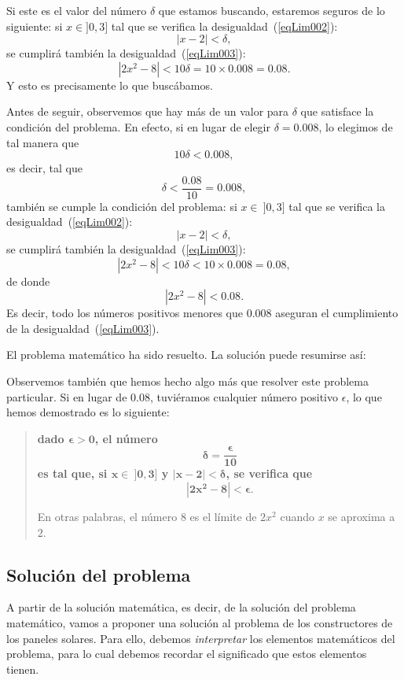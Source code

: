 Si este es el valor del número $\delta$ que estamos buscando, estaremos seguros de lo siguiente: si
$x\in ]0, 3]$ tal que se verifica la desigualdad~(\ref{eqLim002}):
\[
|x - 2| < \delta,
\]
se cumplirá también la desigualdad~(\ref{eqLim003}):
\[
|2x^2 - 8| < 10\delta = 10\times 0.008 = 0.08.
\]
Y esto es precisamente lo que buscábamos.

Antes de seguir, observemos que hay más de un valor para $\delta$ que satisface la condición del
problema. En efecto, si en lugar de elegir $\delta = 0.008$, lo elegimos de tal manera que
\[
10\delta < 0.008,
\]
es decir, tal que
\[
\delta < \frac{0.08}{10} = 0.008,
\]
también se cumple la condición del problema: si $x \in\ ]0, 3]$ tal que se verifica la
desigualdad~(\ref{eqLim002}):
\[
|x - 2| < \delta,
\]
se cumplirá también la desigualdad~(\ref{eqLim003}):
\[
|2x^2 - 8| < 10\delta < 10\times 0.008 = 0.08,
\]
de donde
\[
|2x^2 - 8| < 0.08.
\]
Es decir, todo los números positivos menores que $0.008$ aseguran el cumplimiento de la
desigualdad~(\ref{eqLim003}).

El problema matemático ha sido resuelto. La solución puede resumirse así:%
\marcojc{.9}{1.5}{black}{black}{white}{%
si se elige el número $\delta > 0$ tal que
\[
\delta \leq 0.008,
\]
entonces, si $x\in\ ]0,3]$ y $|x - 2| < \delta$, necesariamente se cumplirá la siguiente
desigualdad:
\[
|2x^2 - 8| < 0.08.
\]
\eijc{-1.5} }

Observemos también que hemos hecho algo más que resolver este problema particular. Si en lugar de
$0.08$, tuviéramos cualquier número positivo $\epsilon$, lo que hemos demostrado es lo siguiente:
\begin{quote}
{\bfseries dado $\bm{\epsilon > 0}$, el número
\[
\bm{\delta = \frac{\epsilon}{10}}
\]
es tal que, si $\bm{x\in\ ]0,3]}$ y $\bm{|x - 2| < \delta}$, se verifica que
\[
\bm{|2x^2 - 8| < \epsilon}.
\]
}

En otras palabras, el número $8$ es el límite de $2x^2$ cuando $x$ se aproxima a $2$.
\end{quote}

\subsection{Solución del problema}
A partir de la solución matemática, es decir, de la solución del problema matemático, vamos a
proponer una solución al problema de los constructores de los paneles solares. Para ello, debemos
\textit{interpretar} los elementos matemáticos del problema, para lo cual debemos recordar el
significado que estos elementos tienen.

